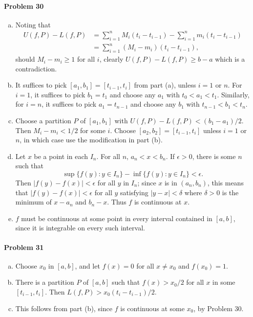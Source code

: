 \documentclass{article}
\begin{document}
\paragraph{Problem 30}
\begin{enumerate}[(a)]
  \item Noting that
    \begin{align*}
      U(f, P) - L(f, P)
      &= \sum_{i=1}^n M_i(t_i - t_{i-1}) - \sum_{i=1}^n m_i (t_i - t_{i-1}) \\
      &= \sum_{i=1}^n (M_i - m_i)(t_i - t_{i-1}),
    \end{align*}
    should $M_i - m_i \geq 1$ for all $i$, clearly $U(f, P) - L(f, P) \geq b -
    a$ which is a contradiction.
  \item It suffices to pick $[a_1, b_1] = [t_{i-1}, t_i]$ from part (a),
    unless $i = 1$ or $n$. For $i = 1$, it suffices to pick $b_1 = t_1$ and
    choose any $a_1$ with $t_0 < a_1 < t_1$. Similarly, for $i = n$, it
    suffices to pick $a_1 = t_{n-1}$ and choose any $b_1$ with $t_{n-1} <
    b_1 < t_n$.
  \item Choose a partition $P$ of $[a_1, b_1]$ with $U(f, P) - L(f, P) < (b_1 -
    a_1)/2$. Then $M_i - m_i < 1/2$ for some $i$. Choose $[a_2, b_2] =
    [t_{i-1}, t_i]$ unless $i = 1$ or $n$, in which case use the modification
    in part (b).
  \item Let $x$ be a point in each $I_n$. For all $n$, $a_n < x < b_n$. If
    $\epsilon > 0$, there is some $n$ such that \[
      \sup\{f(y): y \in I_n\} - \inf\{f(y): y \in I_n\} < \epsilon.
    \] Then $|f(y) - f(x)| < \epsilon$ for all $y$ in $I_n$; since $x$ is in
    $(a_n, b_n)$, this means that $|f(y) - f(x)| < \epsilon$ for all $y$
    satisfying $|y - x| < \delta$ where $\delta > 0$ is the minimum of $x -
    a_n$ and $b_n - x$. Thus $f$ is continuous at $x$.
  \item $f$ must be continuous at some point in every interval contained in
    $[a, b]$, since it is integrable on every such interval.
\end{enumerate}

\paragraph{Problem 31}
\begin{enumerate}[(a)]
  \item Choose $x_0$ in $[a, b]$, and let $f(x) = 0$ for all $x \neq x_0$ and
    $f(x_0) = 1$.
  \item There is a partition $P$ of $[a, b]$ such that $f(x) > x_0/2$ for all
    $x$ in some $[t_{i-1}, t_i]$. Then $L(f, P) > x_0(t_i - t_{i-1})/2$.
  \item This follows from part (b), since $f$ is continuous at some $x_0$, by
    Problem 30.
\end{enumerate}
\end{document}
